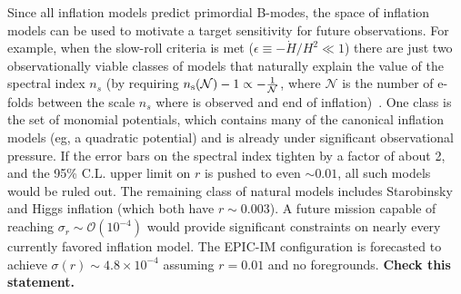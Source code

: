 
Since all inflation models predict primordial B-modes, the space of inflation models can be used to motivate a target sensitivity for future observations. For example, when the slow-roll criteria is met ($\epsilon\equiv-\dot{H}/H^2\ll1$) there are just two observationally viable classes of models that naturally explain the value of the spectral index $n_s$ (by 
requiring $n_{\rm s}(\mathcal{N})-1\propto-\frac{1}{\mathcal{N}}$, where $\mathcal{N}$ is the number of e-folds between 
the scale $n_s$ where is observed and end of inflation)~\cite{Mukhanov:2013tua,Roest:2013fha,Creminelli:2014nqa}. 
One class is the set of monomial potentials, which contains many of the canonical inflation models (eg, a quadratic potential) 
and is already under significant observational pressure. If the error bars on the spectral index tighten by a factor of about 2, 
and the 95\% C.L. upper limit on $r$ is pushed to even $\sim0.01$, all such models would be ruled out. 
The remaining class of natural models includes Starobinsky and Higgs inflation (which both have $r\sim0.003$). A future mission 
capable of reaching $\sigma_r\sim\mathcal{O}(10^{-4})$ would provide significant constraints on nearly every currently favored 
inflation model. The EPIC-IM configuration is forecasted to achieve $\sigma(r)\sim4.8 \times 10^{-4}$ assuming $r=0.01$ 
and no foregrounds. {\bf Check this statement.}
